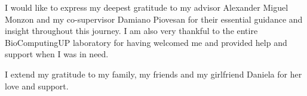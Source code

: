 
I would like to express my deepest gratitude to my advisor Alexander Miguel Monzon and my co-supervisor Damiano Piovesan for their essential guidance and insight throughout this journey. I am also very thankful to the entire BioComputingUP laboratory for having welcomed me and provided help and support when I was in need.

I extend my gratitude to my family, my friends and my girlfriend Daniela for her love and support.

